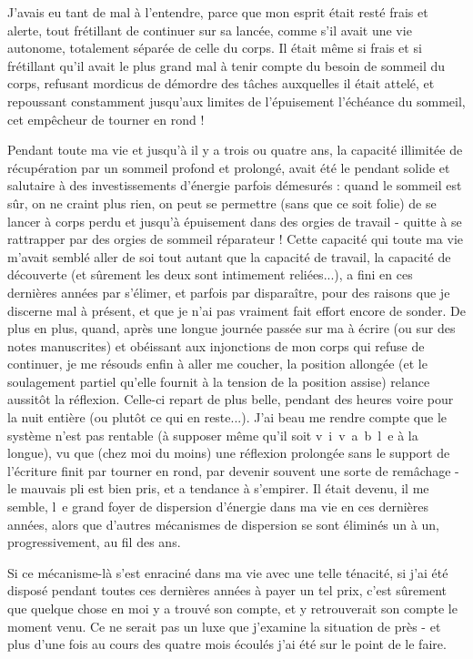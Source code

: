 J'avais eu tant de mal à l'entendre, parce que mon esprit était resté frais et alerte, tout frétillant de continuer sur sa lancée, comme s'il avait une vie autonome, totalement séparée de celle du corps. Il était même si frais et si frétillant qu'il avait le plus grand mal à tenir compte du besoin de sommeil du corps, refusant mordicus de démordre des tâches auxquelles il était attelé, et repoussant constamment jusqu'aux limites de l'épuisement l'échéance du sommeil, cet empêcheur de tourner en rond !

Pendant toute ma vie et jusqu'à il y a trois ou quatre ans, la capacité illimitée de récupération par un sommeil profond et prolongé, avait été le pendant solide et salutaire à des investissements d'énergie parfois démesurés : quand le sommeil est sûr, on ne craint plus rien, on peut se permettre (sans que ce soit folie) de se lancer à corps perdu et jusqu'à épuisement dans des orgies de travail - quitte à se rattrapper par des orgies de sommeil réparateur ! Cette capacité qui toute ma vie m'avait semblé aller de soi tout autant que la capacité de travail, la capacité de découverte (et sûrement les deux sont intimement reliées...), a fini en ces dernières années par s'élimer, et parfois par disparaître, pour des raisons que je discerne mal à présent, et que je n'ai pas vraiment fait effort encore de sonder. De plus en plus, quand, après une longue journée passée sur ma  à écrire (ou sur des notes manuscrites) et obéissant aux injonctions de mon corps qui refuse de continuer, je me résouds enfin à aller me coucher, la position allongée (et le soulagement partiel qu'elle fournit à la tension de la position assise) relance aussitôt la réflexion. Celle-ci repart de plus belle, pendant des heures voire pour la nuit entière (ou plutôt ce qui en reste...). J'ai beau me rendre compte que le système n'est pas rentable (à supposer même qu'il soit \mbox{v i v a b l e} à la longue), vu que (chez moi du moins) une réflexion prolongée sans le support de l'écriture finit par tourner en rond, par devenir souvent une sorte de remâchage - le mauvais pli est bien pris, et a tendance à s'empirer. Il était devenu, il me semble, \mbox{l e} grand foyer de dispersion d'énergie dans ma vie en ces dernières années, alors que d'autres mécanismes de dispersion se sont éliminés un à un, progressivement, au fil des ans.

Si ce mécanisme-là s'est enraciné dans ma vie avec une telle ténacité, si j'ai été disposé pendant toutes ces dernières années à payer un tel prix, c'est sûrement que quelque chose en moi y a trouvé son compte, et y retrouverait son compte le moment venu. Ce ne serait pas un luxe que j'examine la situation de près - et plus d'une fois au cours des quatre mois écoulés j'ai été sur le point de le faire.

